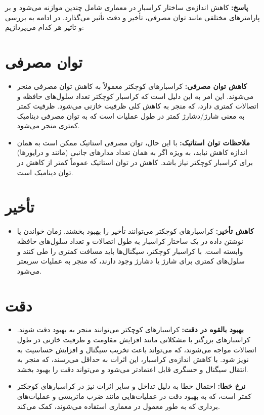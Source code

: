 \documentclass[12pt]{exam}
\begin{document}
\begin{questions}
	\textbf{پاسخ:}
کاهش اندازه‌ی ساختار کراسبار در معماری  شامل چندین موازنه می‌شود و بر پارامترهای مختلفی مانند توان مصرفی، تأخیر و دقت تأثیر می‌گذارد. در ادامه به بررسی و تاثیر هر کدام می‌پردازیم:
	
	\section{توان مصرفی}
	\begin{itemize}
		\item \textbf{کاهش توان مصرفی:} کراسبارهای کوچکتر معمولاً به کاهش توان مصرفی منجر می‌شوند. این امر به این دلیل است که کراسبار کوچکتر تعداد سلول‌های حافظه و اتصالات کمتری دارد، که منجر به کاهش کلی ظرفیت خازنی می‌شود. ظرفیت کمتر به معنی شارژ/دشارژ کمتر در طول عملیات است که به توان مصرفی دینامیک کمتری منجر می‌شود.
		\item \textbf{ملاحظات توان استاتیک:} با این حال، توان مصرفی استاتیک ممکن است به همان اندازه کاهش نیابد، به ویژه اگر به همان تعداد مدارهای جانبی (مانند  و درایورها) برای کراسبار کوچکتر نیاز باشد. کاهش در توان استاتیک عموماً کمتر از کاهش در توان دینامیک است.
	\end{itemize}
	
	\section{تأخیر}
	\begin{itemize}
		\item \textbf{کاهش تأخیر:} کراسبارهای کوچکتر می‌توانند تأخیر را بهبود بخشند. زمان خواندن یا نوشتن داده در یک ساختار کراسبار به طول اتصالات و تعداد سلول‌های حافظه وابسته است. با کراسبار کوچکتر، سیگنال‌ها باید مسافت کمتری را طی کنند و سلول‌های کمتری برای شارژ یا دشارژ وجود دارند، که منجر به عملیات سریعتر می‌شود.
	\end{itemize}
	
	\section{دقت}
	\begin{itemize}
		\item \textbf{بهبود بالقوه در دقت:} کراسبارهای کوچکتر می‌توانند منجر به بهبود دقت شوند. کراسبارهای بزرگتر با مشکلاتی مانند افزایش مقاومت و ظرفیت خازنی در طول اتصالات مواجه می‌شوند، که می‌تواند باعث تخریب سیگنال و افزایش حساسیت به نویز شود. با کاهش اندازه‌ی کراسبار، این اثرات به حداقل می‌رسند، که منجر به انتقال سیگنال و حسگری قابل اعتمادتر می‌شود و می‌تواند دقت را بهبود بخشد.
		\item \textbf{نرخ خطا:} احتمال خطا به دلیل تداخل و سایر اثرات نیز در کراسبارهای کوچکتر کمتر است، که به بهبود دقت در عملیات‌هایی مانند ضرب ماتریسی و عملیات‌های برداری که به طور معمول در معماری  استفاده می‌شوند، کمک می‌کند.
	\end{itemize}
	

\end{questions}
\end{document}

